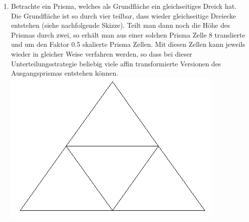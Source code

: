 \documentclass[a4paper,10pt]{scrartcl}
\begin{document}
\begin{enumerate}[1.]
\item
Betrachte ein Prisma, welches als Grundfläche ein gleichseitiges Dreick hat. Die Grundfläche ist so durch vier teilbar, dass wieder gleichseitige Dreiecke entstehen (siehe nachfolgende Skizze). Teilt man dann noch die Höhe des Prismas durch zwei, so erhält man aus einer solchen Prisma Zelle 8 translierte und um den Faktor 0.5 skalierte Prisma Zellen. Mit diesen Zellen kann jeweils wieder in gleicher Weise verfahren werden, so dass bei dieser Unterteilungsstrategie beliebig viele affin transformierte Versionen des Ausgangsprismas entstehen können.\\
\includegraphics[scale=0.3]{triangle.png}


\end{enumerate}
\end{document}
